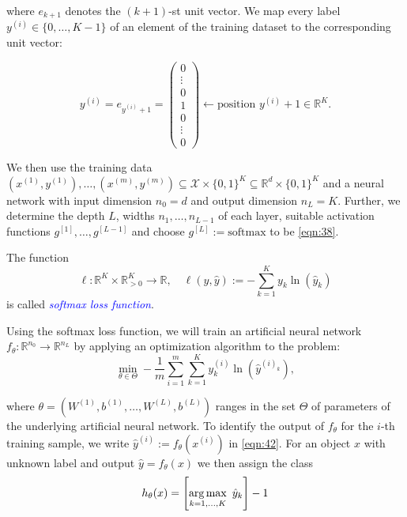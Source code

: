 where $e_{k+1}$ denotes the $(k+1)$-st unit vector. We map every label $y^{(i)} \in \{0, \ldots, K-1\}$ of an element of the training dataset to the corresponding unit vector:

\begin{equation}
    y^{(i)} = e_{y^{(i)}+1} = \begin{pmatrix} 0 \\ \vdots \\ 0 \\ 1 \\ 0 \\ \vdots \\ 0 \end{pmatrix} \leftarrow \text{position } y^{(i)}+1 \in \mathbb{R}^K.
    \label{eqn:40}
\end{equation}

We then use the training data ${(x^{(1)}, y^{(1)}), \ldots, (x^{(m)}, y^{(m)})} \subseteq \mathcal{X} \times \{0, 1\}^K \subseteq \mathbb{R}^d \times \{0, 1\}^K$ and a neural network with input dimension $n_0 =d$ and output dimension $n_L = K$. Further, we determine the depth $L$, widths $n_1, \ldots, n_{L-1}$ of each layer, suitable activation functions $g^{[1]}, \ldots, g^{[L-1]}$ and choose $g^{[L]}:= \text{softmax}$ to be \ref{eqn:38}.

\begin{definition}
The function
\begin{equation}
    \ell : \mathbb{R}^K \times \mathbb{R}^K_{>0} \rightarrow \mathbb{R}, \quad \ell(y, \hat{y}):= -\sum_{k=1}^{K}y_k \ln(\hat{y}_k)
    \label{eqn:41}
\end{equation}
is called \textcolor{blue}{\emph{softmax loss function}}.
\end{definition}

Using the softmax loss function, we will train an artificial neural network $f_{\theta}: \mathbb{R}^{n_0} \rightarrow \mathbb{R}^{n_L}$ by applying an optimization algorithm to the problem:
\begin{equation}
    \min_{\theta \in \Theta} - \frac{1}{m} \sum_{i=1}^{m} \sum_{k=1}^{K} y^{(i)}_k \ln(\hat{y}^{(i)_k}),
    \label{eqn:42}
\end{equation}

where $\theta = (W^{(1)}, b^{(1)}, \ldots, W^{(L)}, b^{(L)})$ ranges in the set $\Theta$ of parameters of the underlying artificial neural network. To identify the output of $f_{\theta}$ for the $i$-th training sample, we write $\hat{y}^{(i)}:= f_{\theta}(x^{(i)})$ in \ref{eqn:42}. For an object $x$ with unknown label and output $\hat{y} = f_{\theta}(x)$ we then assign the class
\begin{equation}
    h_{\theta}(x) = \left[ \operatorname*{arg\,max}_{k=1, \ldots, K}\text{ } \hat{y}_k \right] - 1
    \label{eqn:43}
\end{equation}

